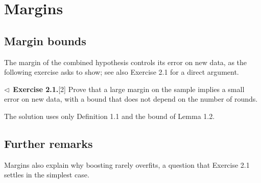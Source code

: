 \documentclass[11pt]{book}
\theoremstyle{smallcaps}
\begin{document}
\chapter{Margins}
\section{Margin bounds}
The margin of the combined hypothesis controls its error on new data, as the following exercise asks to show; see
also Exercise 2.1 for a direct argument.

\medskip
\noindent$\triangleleft$\ \textbf{Exercise 2.1.}[2] Prove that a large margin on the sample implies a small error
on new data, with a bound that does not depend on the number of rounds.\par\medskip
The solution uses only Definition 1.1 and the bound of Lemma 1.2.
\section{Further remarks}
Margins also explain why boosting rarely overfits, a question that Exercise 2.1 settles in the simplest case.
\end{document}
